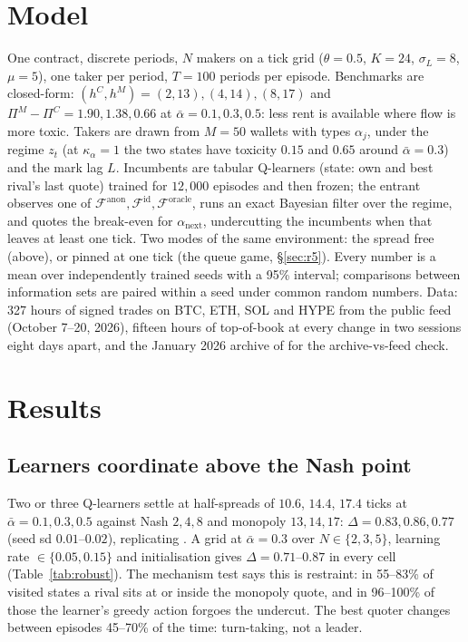\documentclass[10pt]{article}
\newcommand{\Fanon}{\mathcal{F}^{\mathrm{anon}}}
\newcommand{\Fid}{\mathcal{F}^{\mathrm{id}}}
\newcommand{\For}{\mathcal{F}^{\mathrm{oracle}}}
\begin{document}
\section{Model}
One contract, discrete periods, $N$ makers on a tick grid ($\theta=0.5$, $K=24$, $\sigma_L=8$, $\mu=5$), one taker per period, $T=100$ periods per episode. Benchmarks are closed-form: $(h^C,h^M)=(2,13),(4,14),(8,17)$ and $\Pi^M-\Pi^C=1.90,1.38,0.66$ at $\bar\alpha=0.1,0.3,0.5$: less rent is available where flow is more toxic. Takers are drawn from $M=50$ wallets with types $\alpha_j$, under the regime $z_t$ (at $\kappa_\alpha=1$ the two states have toxicity $0.15$ and $0.65$ around $\bar\alpha=0.3$) and the mark lag $L$. Incumbents are tabular Q-learners (state: own and best rival's last quote) trained for $12{,}000$ episodes and then frozen; the entrant observes one of $\Fanon,\Fid,\For$, runs an exact Bayesian filter over the regime, and quotes the break-even for $\alpha_{\mathrm{next}}$, undercutting the incumbents when that leaves at least one tick. Two modes of the same environment: the spread free (above), or pinned at one tick (the queue game, \S\ref{sec:r5}). Every number is a mean over independently trained seeds with a 95\% interval; comparisons between information sets are paired within a seed under common random numbers. Data: 327 hours of signed trades on BTC, ETH, SOL and HYPE from the public feed (October 7--20, 2026), fifteen hours of top-of-book at every change in two sessions eight days apart, and the January 2026 archive of \cite{albers} for the archive-vs-feed check.

\section{Results}
\subsection{Learners coordinate above the Nash point}\label{sec:r1}
Two or three Q-learners settle at half-spreads of $10.6$, $14.4$, $17.4$ ticks at $\bar\alpha=0.1,0.3,0.5$ against Nash $2,4,8$ and monopoly $13,14,17$: $\Delta=0.83,0.86,0.77$ (seed sd $0.01$--$0.02$), replicating \cite{cfl}. A grid at $\bar\alpha=0.3$ over $N\in\{2,3,5\}$, learning rate $\in\{0.05,0.15\}$ and initialisation gives $\Delta=0.71$--$0.87$ in every cell (Table~\ref{tab:robust}). The mechanism test says this is restraint: in 55--83\% of visited states a rival sits at or inside the monopoly quote, and in 96--100\% of those the learner's greedy action forgoes the undercut. The best quoter changes between episodes 45--70\% of the time: turn-taking, not a leader.
\end{document}
